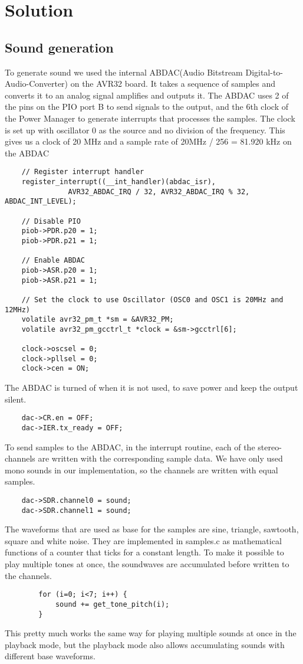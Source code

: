\section{Solution}
\subsection{Sound generation}
To generate sound we used the internal ABDAC(Audio Bitstream Digital-to-Audio-Converter) on the AVR32 board. It takes a sequence of samples and converts it to an analog signal amplifies and outputs it.
The ABDAC uses 2 of the pins on the PIO port B to send signals to the output, and the 6th clock of the Power Manager to generate interrupts that processes the samples. The clock is set up with oscillator 0 as the source and no division of the frequency. This gives us a clock of 20 MHz and a sample rate of 20MHz / 256 = 81.920 kHz on the ABDAC\\
\begin{lstlisting}
	// Register interrupt handler
	register_interrupt((__int_handler)(abdac_isr),
			   AVR32_ABDAC_IRQ / 32, AVR32_ABDAC_IRQ % 32, ABDAC_INT_LEVEL);

	// Disable PIO
	piob->PDR.p20 = 1;
	piob->PDR.p21 = 1;

	// Enable ABDAC
	piob->ASR.p20 = 1;
	piob->ASR.p21 = 1;

	// Set the clock to use Oscillator (OSC0 and OSC1 is 20MHz and 12MHz)
	volatile avr32_pm_t *sm = &AVR32_PM;
	volatile avr32_pm_gcctrl_t *clock = &sm->gcctrl[6];

	clock->oscsel = 0;
	clock->pllsel = 0;
	clock->cen = ON;
\end{lstlisting}

The ABDAC is turned of when it is not used, to save power and keep the output silent.\\
\begin{lstlisting}
	dac->CR.en = OFF;
	dac->IER.tx_ready = OFF;
\end{lstlisting}

To send samples to the ABDAC, in the interrupt routine, each of the stereo-channels are written with the corresponding sample data. We have only used mono sounds in our implementation, so the channels are written with equal samples.\\
\begin{lstlisting}
	dac->SDR.channel0 = sound;
	dac->SDR.channel1 = sound;
\end{lstlisting}

The waveforms that are used as base for the samples are sine, triangle, sawtooth, square and white noise. They are implemented in samples.c as mathematical functions of a counter that ticks for a constant length. To make it possible to play multiple tones at once, the soundwaves are accumulated before written to the channels.\\
\begin{lstlisting}
		for (i=0; i<7; i++) {
			sound += get_tone_pitch(i);
		}
\end{lstlisting}
This pretty much works the same way for playing multiple sounds at once in the playback mode, but the playback mode also allows accumulating sounds with different base waveforms.\\

